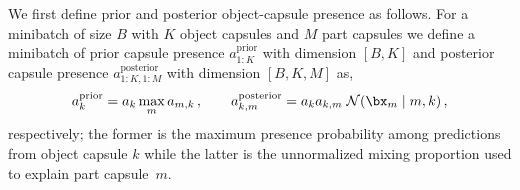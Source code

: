 We first define prior and posterior object-capsule presence as follows.
For a minibatch of size {\small$B$} with {\small$K$} object capsules and $M$ part capsules we define a minibatch of prior capsule presence $a^\mathrm{prior}_{1:K}$ with dimension {\small$[B, K]$} and posterior capsule presence $a^\mathrm{posterior}_{1:K,1:M}$ with dimension {\small$[B, K, M]$} as,
\begin{equation}
a^\mathrm{prior}_k = a_k \max_m a_{m,k}\,,
\qquad
a^\mathrm{posterior}_{k,m} = a_k a_{k,m}\;\gauss{\bx_m \mid m,k}\,,
\end{equation}
respectively; the former is the maximum presence probability among predictions from object capsule $k$ while the latter is the unnormalized mixing proportion used to explain part capsule~$m$.
